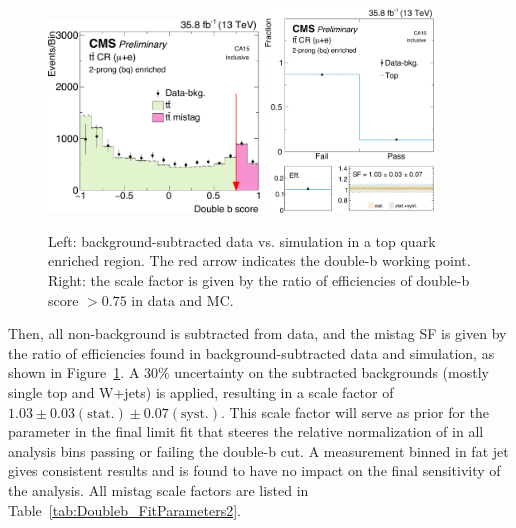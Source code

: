 \begin{figure}[h]
\centering
\includegraphics[width=0.5\textwidth]{figures/higgstagging/n2ddt/cr_ttbar_mu_fj1DoubleCSV.pdf}
\includegraphics[width=0.4\textwidth]{figures/higgstagging/n2ddt/cr_ttbar_mu_fj1DoubleCSV_sf.pdf}\\
\caption{Left: background-subtracted data vs. \ttbar simulation in a top quark enriched region. The red arrow indicates the double-b working point. Right: the scale factor is given by the ratio of efficiencies of double-b score $>0.75$ in data and MC.}
\label{fig:ttbarmistag}
\end{figure}

Then, all non-\ttbar background is subtracted from data, and the mistag SF is given by the ratio of efficiencies found in background-subtracted data and \ttbar simulation, as shown in Figure~\ref{fig:ttbarmistag}. A 30\% uncertainty on the subtracted backgrounds (mostly single top and W+jets) is applied, resulting in a scale factor of $1.03\pm0.03(\text{stat.})\pm0.07(\text{syst.})$. This scale factor will serve as prior for the parameter in the final limit fit that steeres the relative normalization of \ttbar in all analysis bins passing or failing the double-b cut. A measurement binned in fat jet \pt gives consistent results and is found to have no impact on the final sensitivity of the analysis. All \ttbar mistag scale factors are listed in Table~\ref{tab:Doubleb_FitParameters2}.


